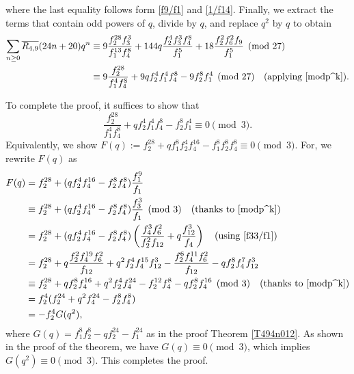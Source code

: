 \documentclass{amsart}
\theoremstyle{definition}
\begin{document}
where the last equality follows form \eqref{f9/f1} and \eqref{1/f14}. Finally, we extract the terms that contain odd powers of $q$, divide by $q$, and replace $q^2$ by $q$ to obtain 
\begin{align*}
\sum_{n\geq0}\overline{R_{4,9}}(24n+20)q^n&\equiv 9\frac{f_2^{28}f_3^3}{f_1^{13}f_4^8}+144q\frac{f_2^4f_3^3f_4^8}{f_1^5}+18\frac{f_2^2f_{6}^2f_{9}}{f_1^5} \pmod{27}\\
&\equiv 9\frac{f_2^{28}}{f_1^4f_4^8}+9qf_2^4f_1^4f_4^8-9f_2^8f_1^4 \pmod{27} \quad \text{(applying \eqref{modp^k})}.
\end{align*}

To complete the proof, it suffices to show that 
$$\frac{f_2^{28}}{f_1^4f_4^8}+qf_2^4f_1^4f_4^8-f_2^8f_1^4\equiv0 \pmod{3}.$$
Equivalently, we show $F(q):=f_2^{28}+qf_1^8f_2^4f_4^{16}-f_1^8f_2^8f_4^8\equiv0\pmod{3}$. For, we rewrite $F(q)$ as
\begin{align*}
    F(q)&=f_2^{28}+(qf_2^4f_4^{16}-f_2^8f_4^8)\frac{f_1^9}{f_1}\\
    &\equiv f_2^{28}+(qf_2^4f_4^{16}-f_2^8f_4^8)\frac{f_3^3}{f_1}\pmod{3}\quad\text{(thanks to \eqref{modp^k})}\\
    &=f_2^{28}+(qf_2^4f_4^{16}-f_2^8f_4^8)\left(\frac{f_4^3f_6^2}{f_2^2f_{12}}+q\frac{f_{12}^3}{f_4}\right) \quad \text{(using \eqref{f33/f1})}\\
    &=f_2^{28}+q\frac{f_2^2f_4^{19}f_6^2}{f_{12}}+q^2f_2^4f_4^{15}f_{12}^3-\frac{f_2^6f_4^{11}f_6^2}{f_{12}}-qf_2^8f_4^7f_{12}^3\\
    &\equiv f_2^{28}+qf_2^8f_4^{16}+q^2f_2^4f_4^{24}-f_2^{12}f_4^8-qf_2^8f_4^{16}\pmod{3} \quad\text{(thanks to \eqref{modp^k})}\\
    &=f_2^4(f_2^{24}+q^2f_4^{24}-f_2^{8}f_4^8)\\
    &=-f_2^4G(q^2),
\end{align*}
where $G(q)=f_1^8f_2^8-qf_2^{24}-f_1^{24}$ as in the proof Theorem \ref{T494n012}. As shown in the proof of the theorem, we have $G(q)\equiv0\pmod{3}$, which implies $G(q^2)\equiv0\pmod{3}$. This completes the proof.



\nocite{*}

\end{document}
